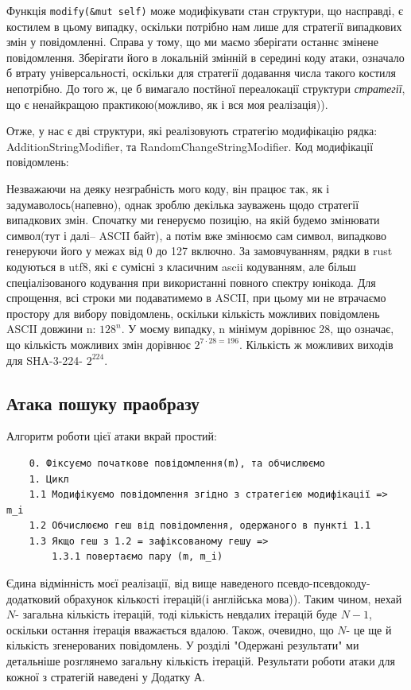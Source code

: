 \documentclass[12pt]{article}
\begin{document}
Функція \lstinline{modify(&mut self)} може модифікувати стан структури, що насправді, є костилем в цьому випадку, оскільки потрібно нам лише для стратегії випадкових змін у повідомленні. Справа у тому, що ми маємо зберігати останнє змінене повідомлення. Зберігати його в локальній змінній в середині коду атаки, означало б втрату універсальності, оскільки для стратегії додавання числа такого костиля непотрібно. До того ж, це б вимагало постйної переалокації структури \textit{стратегії}, що є ненайкращою практикою(можливо, як і вся моя реалізація)).

Отже, у нас є дві структури, які реалізовують стратегію модифікацію рядка: AdditionStringModifier, та RandomChangeStringModifier. Код модифікації повідомлень:

Незважаючи на деяку незграбність мого коду, він працює так, як і задумаволось(напевно), однак зроблю декілька зауважень щодо стратегії випадкових змін. Спочатку ми генеруємо позицію, на якій будемо змінювати символ(тут і далі-- ASCII байт), а потім вже змінюємо сам символ, випадково генеруючи його у межах від 0 до 127 включно. За замовчуванням, рядки в rust кодуються в utf8, які є сумісні з класичним ascii кодуванням, але більш спеціалізованого кодування при використанні повного спектру юнікода. Для спрощення, всі строки ми подаватимемо в ASCII, при цьому ми не втрачаємо простору для вибору повідомлень, оскільки кількість можливих повідомлень ASCII довжини n: $128^n$. У моєму випадку, n мінімум дорівнює 28, що означає, що кількість можливих змін дорівнює $2^{7 \cdot 28 = 196}$. Кількість ж можливих виходів для SHA-3-224- $2^{224}$.

\subsection{Атака пошуку праобразу}

Алгоритм роботи цієї атаки вкрай простий:

\begin{verbatim}
    0. Фіксуємо початкове повідомлення(m), та обчислюємо 
    1. Цикл
    1.1 Модифікуємо повідомлення згідно з стратегією модифікації => m_i
    1.2 Обчислюємо геш від повідомлення, одержаного в пункті 1.1
    1.3 Якщо геш з 1.2 = зафіксованому гешу => 
        1.3.1 повертаємо пару (m, m_i)
\end{verbatim}

Єдина відмінність моєї реалізації, від вище наведеного псевдо-псевдокоду- додатковий обрахунок кількості ітерацій(і англійська мова)). Таким чином, нехай $N$- загальна кількість ітерацій, тоді кількість невдалих ітерацій буде $N - 1$, оскільки остання ітерація вважається вдалою. Також, очевидно, що $N$- це ще й кількість згенерованих повідомлень. У розділі "Одержані результати" ми детальніше розглянемо загальну кількість ітерацій. Результати роботи атаки для кожної з стратегій наведені у Додатку А.
\end{document}
